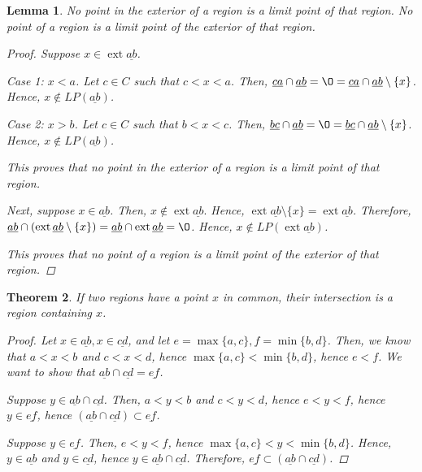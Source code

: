 \documentclass[11pt]{article}
\renewcommand{\emptyset}{\O}
\renewcommand{\_}[1]{\underline{ #1 }}
\DeclareMathOperator{\ext}{ext}
\newtheorem{theorem}{Theorem}[section]
\newtheorem{lemma}[theorem]{Lemma}
\theoremstyle{definition}
\numberwithin{equation}{subsection}
\begin{document}
\begin{lemma}  No point in the exterior of a region is a limit point of that region.  No point of a region is a limit point of the exterior of that region.

\begin{proof}
Suppose $x \in \ext{\_{ab}}$.

Case 1: $x < a$. Let $c \in C$ such that $c < x< a$. Then, $\_{ca} \cap \_{ab} = \emptyset = \_{ca} \cap \_{ab} \setminus \{x\}$. Hence, $x \notin LP(\_{ab})$.

Case 2: $x > b$. Let $c \in C$ such that $b< x< c$. Then, $\_{bc} \cap \_{ab} = \emptyset = \_{bc} \cap \_{ab} \setminus \{x\}$. Hence, $x \notin LP(\_{ab})$.

This proves that no point in the exterior of a region is a limit point of that region.

Next, suppose $x \in \_{ab}$. Then, $x \notin \ext{\_{ab}}.$ Hence, $\ext{\_{ab}} \setminus \{x\} = \ext{\_{ab}}$. Therefore, $\_{ab} \cap (\ext{\_{ab}} \setminus \{x\}) = \_{ab} \cap \ext{\_{ab}} = \emptyset$. Hence, $x \notin LP(\ext{\_{ab}})$. 

This proves that no point of a region is a limit point of the exterior of that region.

\renewcommand\qedsymbol{QED}
\end{proof}
\end{lemma}


\begin{theorem}  If two regions have a point $x$ in common, their intersection is a region containing $x$.

\begin{proof}
Let $x \in \_{ab}, x \in \_{cd}$, and let $e = \max\{a,c\}, f =\min \{b,d\}$. Then, we know that $a <x<b$ and $c<x<d$, hence $\max\{a,c\}<\min \{b,d\}$, hence $e<f$. We want to show that $ \_{ab} \cap  \_{cd}= \_{ef}$.

Suppose $y \in \_{ab} \cap  \_{cd}$. Then, $a<y<b$ and $c<y<d$, hence $e<y<f$, hence $y \in \_{ef}$, hence $(\_{ab} \cap  \_{cd}) \subset \_{ef}$.

Suppose $y \in \_{ef}$. Then, $e<y<f$, hence $\max\{a,c\}<y<\min\{b,d\}$. Hence, $y \in \_{ab}$ and $y \in \_{cd}$, hence $y \in \_{ab} \cap  \_{cd}$. Therefore, $\_{ef} \subset (\_{ab} \cap  \_{cd})$.

\renewcommand\qedsymbol{QED}
\end{proof}

\end{theorem}
\end{document}
